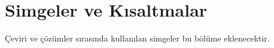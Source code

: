 \chapter*{Simgeler ve Kısaltmalar}

\begin{justify}
\begin{footnotesize}
Çeviri ve çözümler sırasında kullanılan simgeler bu bölüme eklenecektir.
\end{footnotesize}
\end{justify}
\newpage
